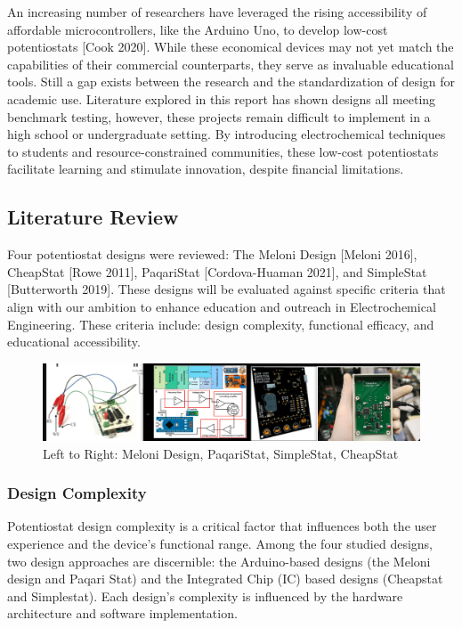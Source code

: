 \documentclass{article}
\begin{document}
An increasing number of researchers have leveraged the rising accessibility of affordable microcontrollers, like the Arduino Uno, to develop low-cost potentiostats [Cook 2020]. While these economical devices may not yet match the capabilities of their commercial counterparts, they serve as invaluable educational tools. Still a gap exists between the research and the standardization of design for academic use. Literature explored in this report has shown designs all meeting benchmark testing, however, these projects remain difficult to implement in a high school or undergraduate setting. By introducing electrochemical techniques to students and resource-constrained communities, these low-cost potentiostats facilitate learning and stimulate innovation, despite financial limitations.

\subsection*{Literature Review}
Four potentiostat designs were reviewed: The Meloni Design [Meloni 2016], CheapStat [Rowe 2011], PaqariStat [Cordova-Huaman 2021], and SimpleStat [Butterworth 2019]. These designs will be evaluated against specific criteria that align with our ambition to enhance education and outreach in Electrochemical Engineering. These criteria include: design complexity, functional efficacy, and educational accessibility.
\begin{figure}[H]
    \centering
    \includegraphics[width=1\linewidth]{review.png}
    \caption{Left to Right: Meloni Design, PaqariStat, SimpleStat, CheapStat}
\end{figure}
\subsubsection*{Design Complexity}
Potentiostat design complexity is a critical factor that influences both the user experience and the device's functional range. Among the four studied designs, two design approaches are discernible: the Arduino-based designs (the Meloni design and Paqari Stat) and the Integrated Chip (IC) based designs (Cheapstat and Simplestat). Each design's complexity is influenced by the hardware architecture and software implementation.
\end{document}
